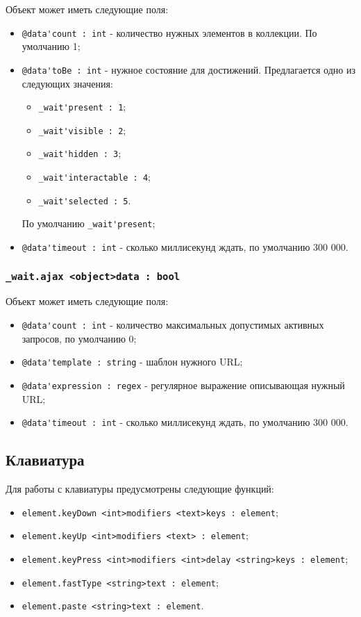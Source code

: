 \documentclass[a4paper, 14pt]{extarticle}
\newenvironment{icItems}
	{ \begin{itemize} [noitemsep,nolistsep] }
	{ \end{itemize} }
\begin{document}
Объект  может иметь следующие поля:
\begin{icItems}
	\item \lstinline|@data'count : int| - количество нужных элементов в коллекции. По умолчанию 1;
	\item \lstinline|@data'toBe : int| - нужное состояние для достижений. Предлагается одно из следующих значения:
	\begin{icItems}
		\item \lstinline|_wait'present : 1|;
		\item \lstinline|_wait'visible : 2|;
		\item \lstinline|_wait'hidden : 3|;
		\item \lstinline|_wait'interactable : 4|;
		\item \lstinline|_wait'selected : 5|.
	\end{icItems}
	По умолчанию \lstinline|_wait'present|;
	\item \lstinline|@data'timeout : int| - сколько миллисекунд ждать, по умолчанию 300 000.
\end{icItems}

\subsubsection{\lstinline|_wait.ajax <object>data : bool|}

Объект  может иметь следующие поля:
\begin{icItems}
	\item \lstinline|@data'count : int| - количество максимальных допустимых активных запросов, по умолчанию 0;
	\item \lstinline|@data'template : string| - шаблон нужного URL;
	\item \lstinline|@data'expression : regex| - регулярное выражение описывающая нужный URL;
	\item \lstinline|@data'timeout : int| - сколько миллисекунд ждать, по умолчанию 300 000.
\end{icItems}

\subsection{Клавиатура}

Для работы с клавиатуры предусмотрены следующие функций:
\begin{icItems}
	\item \lstinline|element.keyDown <int>modifiers <text>keys : element|;
	\item \lstinline|element.keyUp <int>modifiers <text> : element|;
	\item \lstinline|element.keyPress <int>modifiers <int>delay <string>keys : element|;
	\item \lstinline|element.fastType <string>text : element|;
	\item \lstinline|element.paste <string>text : element|.
\end{icItems}
\end{document}
